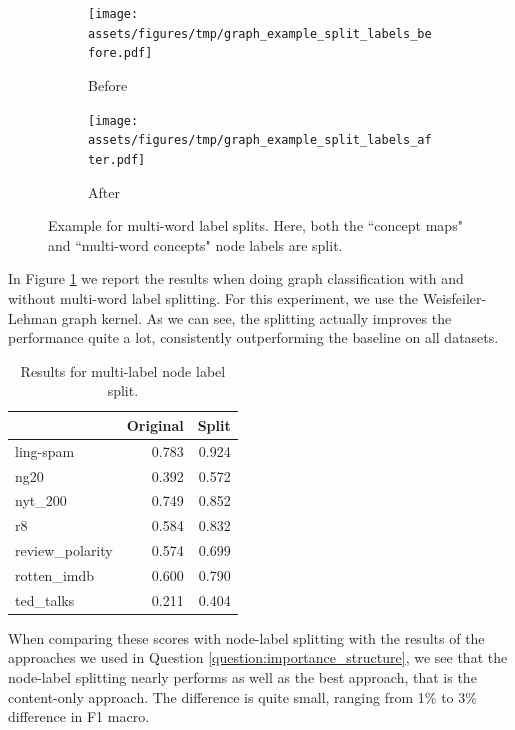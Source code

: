 \begin{figure}[htb!]
	\centering
	\begin{subfigure}[t]{.4\linewidth}	{\texttt{[image: assets/figures/tmp/graph\_example\_split\_labels\_before.pdf]}}
		\caption{Before}
	\end{subfigure}
\hspace{2cm}
	\begin{subfigure}[t]{.4\linewidth}	{\texttt{[image: assets/figures/tmp/graph\_example\_split\_labels\_after.pdf]}}
		\caption{After}
	\end{subfigure}
	\caption[Example: Multi-word node labels Splitting]{Example for multi-word label splits. Here, both the ``concept maps" and ``multi-word concepts" node labels are  split.}\label{fig:example_split_labels}
\end{figure}


In Figure \ref{table:results_multi_label_split} we report the results when doing graph classification with and without multi-word label splitting.
For this experiment, we use the Weisfeiler-Lehman graph kernel.
As we can see, the splitting actually improves the performance quite a lot, consistently outperforming the baseline on all datasets.

\begin{table}[htb!]
	\centering
\begin{tabular}{lrr}
	{} &  Original &  Split \\
	\midrule
	ling-spam       & 0.783 & 0.924 \\
	ng20            & 0.392 & 0.572 \\
	nyt\_200         & 0.749 & 0.852 \\
	r8              & 0.584 & 0.832 \\
	review\_polarity & 0.574 & 0.699 \\
	rotten\_imdb     & 0.600 & 0.790 \\
	ted\_talks       & 0.211 & 0.404 \\
	\bottomrule
\end{tabular}
\caption[Results: Multi-label split]{Results for multi-label node label split.}\label{table:results_multi_label_split}
\end{table}

When comparing these scores with node-label splitting with the results of the approaches we used in Question \ref{question:importance_structure}, we see that the node-label splitting nearly performs as well as the best approach, that is the content-only approach.
The difference is quite small, ranging from 1\% to 3\% difference in F1 macro.

